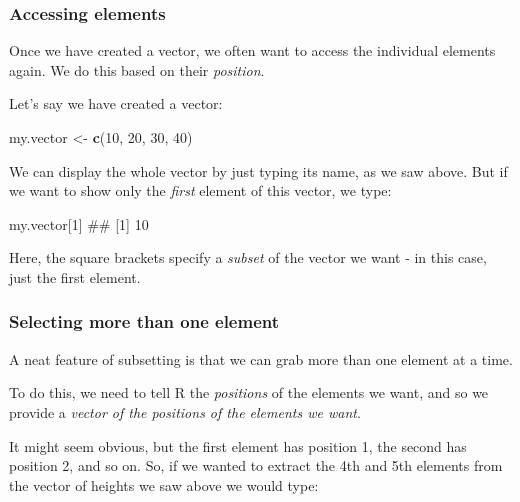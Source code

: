 \documentclass[]{article}
\newenvironment{Shaded}{\begin{snugshade}}{\end{snugshade}}
\newcommand{\KeywordTok}[1]{\textcolor[rgb]{0.13,0.29,0.53}{\textbf{#1}}}
\newcommand{\DecValTok}[1]{\textcolor[rgb]{0.00,0.00,0.81}{#1}}
\newcommand{\StringTok}[1]{\textcolor[rgb]{0.31,0.60,0.02}{#1}}
\newcommand{\NormalTok}[1]{#1}
\theoremstyle{definition}
\theoremstyle{definition}
\theoremstyle{definition}
\theoremstyle{remark}
\begin{document}
\hypertarget{access-vector-elements}{\subsubsection*{Accessing
elements}\label{access-vector-elements}}

Once we have created a vector, we often want to access the individual
elements again. We do this based on their \emph{position}.

Let's say we have created a vector:

\begin{Shaded}
\begin{Highlighting}[]
\NormalTok{my.vector <-}\StringTok{ }\KeywordTok{c}\NormalTok{(}\DecValTok{10}\NormalTok{, }\DecValTok{20}\NormalTok{, }\DecValTok{30}\NormalTok{, }\DecValTok{40}\NormalTok{)}
\end{Highlighting}
\end{Shaded}

We can display the whole vector by just typing its name, as we saw
above. But if we want to show only the \emph{first} element of this
vector, we type:

\begin{Shaded}
\begin{Highlighting}[]
\NormalTok{my.vector[}\DecValTok{1}\NormalTok{]}
\NormalTok{## [1] 10}
\end{Highlighting}
\end{Shaded}

Here, the square brackets specify a \emph{subset} of the vector we want
- in this case, just the first element.

\subsubsection*{Selecting more than one
element}\label{selecting-more-than-one-element}

A neat feature of subsetting is that we can grab more than one element
at a time.

To do this, we need to tell R the \emph{positions} of the elements we
want, and so we provide a \emph{vector of the positions of the elements
we want}.

It might seem obvious, but the first element has position 1, the second
has position 2, and so on. So, if we wanted to extract the 4th and 5th
elements from the vector of heights we saw above we would type:
\end{document}
